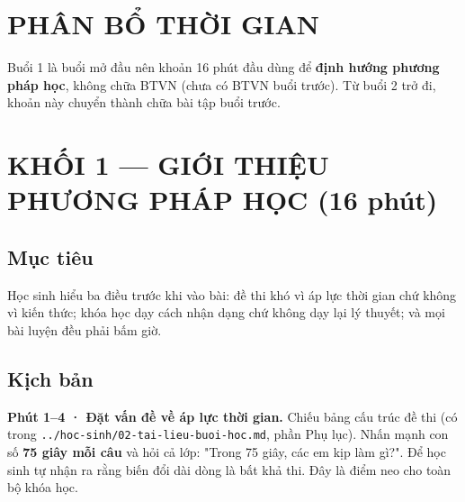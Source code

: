 \documentclass[11pt, a4paper]{article}
\begin{document}

\section{PHÂN BỔ THỜI GIAN}


Buổi 1 là buổi mở đầu nên khoản 16 phút đầu dùng để \textbf{định hướng phương pháp học}, không chữa BTVN (chưa có BTVN buổi trước). Từ buổi 2 trở đi, khoản này chuyển thành chữa bài tập buổi trước.

\section{KHỐI 1 — GIỚI THIỆU PHƯƠNG PHÁP HỌC (16 phút)}

\subsection{Mục tiêu}

Học sinh hiểu ba điều trước khi vào bài: đề thi khó vì áp lực thời gian chứ không vì kiến thức; khóa học dạy cách nhận dạng chứ không dạy lại lý thuyết; và mọi bài luyện đều phải bấm giờ.

\subsection{Kịch bản}

\textbf{Phút 1–4 · Đặt vấn đề về áp lực thời gian.} Chiếu bảng cấu trúc đề thi (có trong \texttt{../hoc-sinh/02-tai-lieu-buoi-hoc.md}, phần Phụ lục). Nhấn mạnh con số \textbf{75 giây mỗi câu} và hỏi cả lớp: "Trong 75 giây, các em kịp làm gì?". Để học sinh tự nhận ra rằng biến đổi dài dòng là bất khả thi. Đây là điểm neo cho toàn bộ khóa học.
\end{document}

